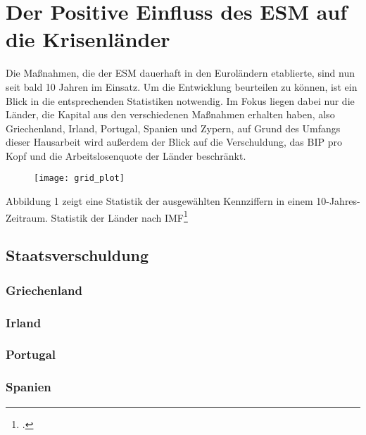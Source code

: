 \newpage
\section{Der Positive Einfluss des \gls{ESM} auf die Krisenländer}
Die Maßnahmen, die der \gls{ESM} dauerhaft in den Euroländern etablierte, sind nun seit bald 10 Jahren im Einsatz. Um die Entwicklung beurteilen zu können, ist ein Blick in die entsprechenden Statistiken notwendig. Im Fokus liegen dabei nur die Länder, die Kapital aus den verschiedenen Maßnahmen erhalten haben, also Griechenland, Irland, Portugal, Spanien und Zypern, auf Grund des Umfangs dieser Hausarbeit wird außerdem der Blick auf die Verschuldung, das \gls{BIP} pro Kopf und die
Arbeitslosenquote der Länder beschränkt.
\begin{figure}[H]
\begin{center}
\texttt{[image: grid\_plot]}
\end{center}%
\end{figure} %
Abbildung 1 zeigt eine Statistik der ausgewählten Kennziffern in einem 10-Jahres-Zeitraum.
Statistik der Länder nach \gls{IMF}\footcite[Aufgerufen am 29.02.2019][man erstelle eine CSV Tabelle mit entsprechenden Quellen]{international_monetary_fund_world_2018}
\subsection{Staatsverschuldung}
\subsubsection{Griechenland}
\subsubsection{Irland}
\subsubsection{Portugal}
\subsubsection{Spanien}
